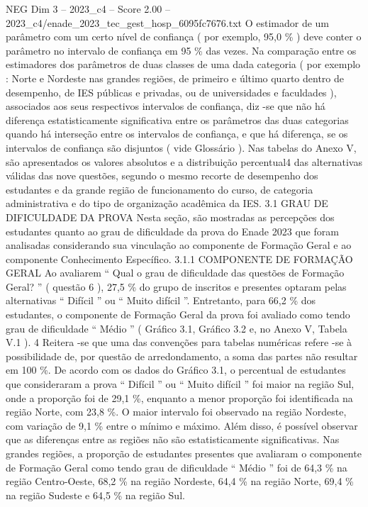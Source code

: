 \begin{textsample}{NEG Dim 3 – 2023\_c4 – Score 2.00 – 2023\_c4/enade\_2023\_tec\_gest\_hosp\_6095fc7676.txt}
O estimador de um parâmetro com um certo nível de confiança ( por exemplo, 95,0 \% ) deve conter o parâmetro no intervalo de confiança em 95 \% das vezes.
Na comparação entre os estimadores dos parâmetros de duas classes de uma dada categoria ( por exemplo : Norte e Nordeste nas grandes regiões, de primeiro e último quarto dentro de desempenho, de IES públicas e privadas, ou de universidades e faculdades ), associados aos seus respectivos intervalos de confiança, diz -se que não há diferença estatisticamente significativa entre os parâmetros das duas categorias quando há interseção entre os intervalos de confiança, e que há diferença, se os intervalos de confiança são disjuntos ( vide Glossário ).
Nas tabelas do Anexo V, são apresentados os valores absolutos e a distribuição percentual4 das alternativas válidas das nove questões, segundo o mesmo recorte de desempenho dos estudantes e da grande região de funcionamento do curso, de categoria administrativa e do tipo de organização acadêmica da IES. 3.1 GRAU DE DIFICULDADE DA PROVA Nesta seção, são mostradas as percepções dos estudantes quanto ao grau de dificuldade da prova do Enade 2023 que foram analisadas considerando sua vinculação ao componente de Formação Geral e ao componente Conhecimento Específico. 3.1.1 COMPONENTE DE FORMAÇÃO GERAL Ao avaliarem “ Qual o grau de dificuldade das questões de Formação Geral? ” ( questão 6 ), 27,5 \% do grupo de inscritos e presentes optaram pelas alternativas “ Difícil ” ou “ Muito difícil ”.
Entretanto, para 66,2 \% dos estudantes, o componente de Formação Geral da prova foi avaliado como tendo grau de dificuldade “ Médio ” ( Gráfico 3.1, Gráfico 3.2 e, no Anexo V, Tabela V.1 ). 4 Reitera -se que uma das convenções para tabelas numéricas refere -se à possibilidade de, por questão de arredondamento, a soma das partes não resultar em 100 \%.
De acordo com os dados do Gráfico 3.1, o percentual de estudantes que consideraram a prova “ Difícil ” ou “ Muito difícil ” foi maior na região Sul, onde a proporção foi de 29,1 \%, enquanto a menor proporção foi identificada na região Norte, com 23,8 \%.
O maior intervalo foi observado na região Nordeste, com variação de 9,1 \% entre o mínimo e máximo.
Além disso, é possível observar que as diferenças entre as regiões não são estatisticamente significativas.
Nas grandes regiões, a proporção de estudantes presentes que avaliaram o componente de Formação Geral como tendo grau de dificuldade “ Médio ” foi de 64,3 \% na região Centro-Oeste, 68,2 \% na região Nordeste, 64,4 \% na região Norte, 69,4 \% na região Sudeste e 64,5 \% na região Sul.

\end{textsample}
